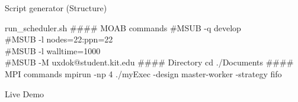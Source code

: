 	\begin{frame}{Script generator (Structure)}
		
		\begin{block}{run\_scheduler.sh}
		        \#\#\#\# MOAB commands
		        \newline
		        \newline
				\#MSUB  -q develop\\
				\#MSUB  -l nodes=22:ppn=22\\
				\#MSUB  -l walltime=1000\\
				\#MSUB  -M uxdok@student.kit.edu
				\newline
				\newline
        				\#\#\#\# Directory
				\newline
				\newline
				cd ./Documents
				\newline
				\newline
        				\#\#\#\# MPI commands
        			\newline
        			\newline
				mpirun -np 4 ./myExec -design master-worker -strategy fifo
			
		\end{block}
	\end{frame}
	
	
	\begin{frame}
		\begin{center}
			Live Demo
		\end{center}		
	\end{frame}